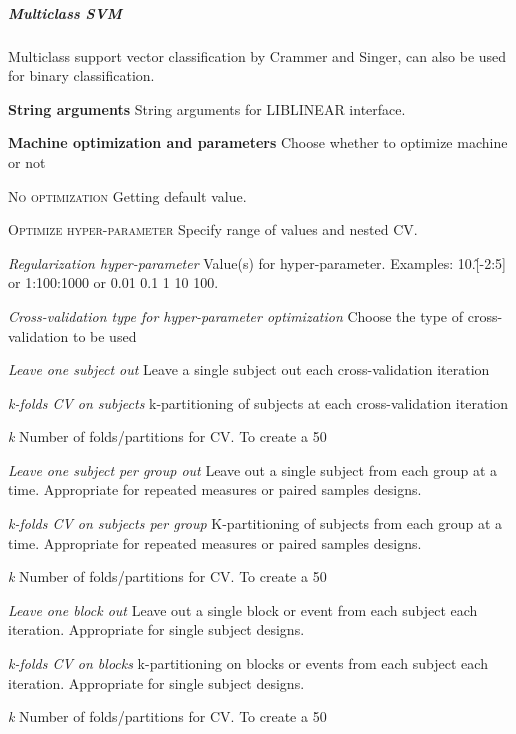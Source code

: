 \subparagraph{Multiclass SVM}
Multiclass support vector classification by Crammer and Singer, can also be used for binary classification.


\textbf{String arguments}
String arguments for LIBLINEAR interface.


\textbf{Machine optimization and parameters}
Choose whether to optimize machine or not


\textsc{No optimization}
Getting default value.


\textsc{Optimize hyper-parameter}
Specify range of values and nested CV.


\textsl{Regularization hyper-parameter}
Value(s) for hyper-parameter. Examples: 10.\^[-2:5] or 1:100:1000 or 0.01 0.1 1 10 100.


\textsl{Cross-validation type for hyper-parameter optimization}
Choose the type of cross-validation to be used


\textit{Leave one subject out}
Leave a single subject out each cross-validation iteration


\textit{k-folds CV on subjects}
k-partitioning of subjects at each cross-validation iteration


\textit{k}
Number of folds/partitions for CV. To create a 50%


\textit{Leave one subject per group out}
Leave out a single subject from each group at a time. Appropriate for repeated measures or paired samples designs.


\textit{k-folds CV on subjects per group}
K-partitioning of subjects from each group at a time. Appropriate for repeated measures or paired samples designs.


\textit{k}
Number of folds/partitions for CV. To create a 50%


\textit{Leave one block out}
Leave out a single block or event from each subject each iteration. Appropriate for single subject designs.


\textit{k-folds CV on blocks}
k-partitioning on blocks or events from each subject each iteration. Appropriate for single subject designs.


\textit{k}
Number of folds/partitions for CV. To create a 50%


